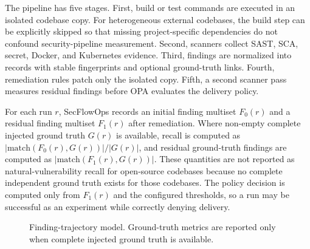 The pipeline has five stages. First, build or test commands are executed in an isolated codebase copy. For heterogeneous external codebases, the build step can be explicitly skipped so that missing project-specific dependencies do not confound security-pipeline measurement. Second, scanners collect SAST, SCA, secret, Docker, and Kubernetes evidence. Third, findings are normalized into records with stable fingerprints and optional ground-truth links. Fourth, remediation rules patch only the isolated copy. Fifth, a second scanner pass measures residual findings before OPA evaluates the delivery policy.

For each run $r$, SecFlowOps records an initial finding multiset $F_0(r)$ and a residual finding multiset $F_1(r)$ after remediation. Where non-empty complete injected ground truth $G(r)$ is available, recall is computed as $|\mathrm{match}(F_0(r),G(r))|/|G(r)|$, and residual ground-truth findings are computed as $|\mathrm{match}(F_1(r),G(r))|$. These quantities are not reported as natural-vulnerability recall for open-source codebases because no complete independent ground truth exists for those codebases. The policy decision is computed only from $F_1(r)$ and the configured thresholds, so a run may be successful as an experiment while correctly denying delivery.

\begin{figure}[t]
\centering
{}
\caption{Finding-trajectory model. Ground-truth metrics are reported only when complete injected ground truth is available.}
\label{fig:finding-trajectory}
\end{figure}

